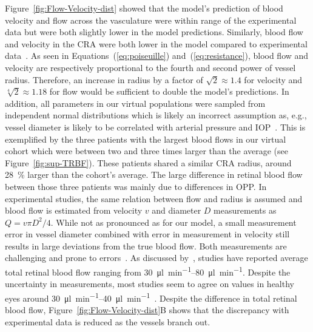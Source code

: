 \documentclass[11pt,]{article}
\begin{document}
Figure~\ref{fig:Flow-Velocity-dist} showed that the model's prediction of blood velocity and flow across the vasculature were within range of the experimental data but were both slightly lower in the model predictions\cite{Riva1985,DoblhoffDier2014}.
Similarly, blood flow and velocity in the CRA were both lower in the model compared to experimental data~\cite{DoblhoffDier2014,Riva1985,Dorner2009,Feke_1989}.
As seen in Equations~(\ref{eq:poiseuille}) and~(\ref{eq:resistance}), blood flow and velocity are respectively proportional to the fourth and second power of vessel radius.
Therefore, an increase in radius by a factor of $\sqrt{2}\approx 1.4$ for velocity and $\sqrt[4]{2}\approx 1.18$ for flow would be sufficient to double the model's predictions.
In addition, all parameters in our virtual populations were sampled from independent normal distributions which is likely an incorrect assumption as, e.g., vessel diameter is likely to be correlated with arterial pressure and IOP~\cite{Dziedziak_2022}.
This is exemplified by the three patients with the largest blood flows in our virtual cohort which were between two and three times larger than the average (see Figure~\ref{fig:sup-TRBF}).
These patients shared a similar CRA radius, around \SI{28}{\percent} larger than the cohort's average.
The large difference in retinal blood flow between those three patients was mainly due to differences in OPP.
In experimental studies, the same relation between flow and radius is assumed and blood flow is estimated from velocity $v$ and diameter $D$ measurements as $Q=v\pi D^2/4$.
While not as pronounced as for our model, a small measurement error in vessel diameter combined with error in measurement in velocity still results in large deviations from the true blood flow.
Both measurements are challenging and prone to errors~\cite{Leitgeb_2014}.
As discussed by~\cite{DoblhoffDier2014}, studies have reported average total retinal blood flow ranging from \SIrange[per-mode=symbol]{30}{80}{\micro\litre\per\minute}\cite{DoblhoffDier2014,Riva1985,Feke_1989}.
Despite the uncertainty in measurements, most studies seem to agree on values in healthy eyes around \SIrange{30}{40}{\micro\litre\per\minute}~\cite{DoblhoffDier2014,Riva1985}.
Despite the difference in total retinal blood flow, Figure~\ref{fig:Flow-Velocity-dist}B shows that the discrepancy with experimental data is reduced as the vessels branch out.
\end{document}
